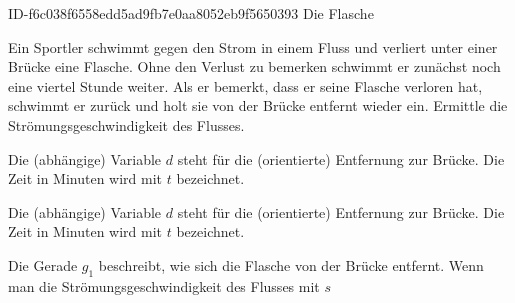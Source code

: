 \begin{exercise}
      {ID-f6c038f6558edd5ad9fb7e0aa8052eb9f5650393}
      {Die Flasche}
  \ifproblem\problem\par
    Ein Sportler schwimmt gegen den Strom in einem Fluss und verliert unter
    einer Brücke eine Flasche. Ohne den Verlust zu bemerken schwimmt er
    zunächst noch eine viertel Stunde weiter. Als er bemerkt, dass er seine
    Flasche verloren hat, schwimmt er zurück und holt sie  von der
    Brücke entfernt wieder ein. Ermittle die Strömungsgeschwindigkeit des
    Flusses.
  \fi
  \ifoutline\outline\par
    Die (abhängige) Variable $d$ steht für die (orientierte) Entfernung
    zur Brücke. Die Zeit in Minuten wird mit $t$ bezeichnet.
    \begin{center}
    \end{center}
  \fi
  \ifoutcome\outcome\par
    Die (abhängige) Variable $d$ steht für die (orientierte) Entfernung
    zur Brücke. Die Zeit in Minuten wird mit $t$ bezeichnet.
    \begin{center}
    \end{center}
    Die Gerade $g_{1}$ beschreibt, wie sich die Flasche von der Brücke
    entfernt. Wenn man die Strömungsgeschwindigkeit des Flusses mit $s$

\end{exercise}
